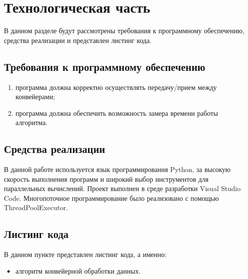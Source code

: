 \documentclass[a4paper, 12pt]{article}
\begin{document}
\section{Технологическая часть}
\begin{flushleft}
	\hspace*{5mm} В данном разделе будут рассмотрены требования к программному обеспечению, средства реализации и представлен листинг кода.
	\subsection{Требования к программному обеспечению}
		\begin{enumerate}
		\item программа должна корректно осуществлять передачу/прием между конвейерами;
		\item программа должна обеспечить возможность замера времени работы алгоритма. 
	\end{enumerate}
	\subsection{Средства реализации}
	\hspace*{5mm} В данной работе используется язык программирования Python, за высокую скорость выполнения программ и широкий выбор инструментов для параллельных вычислений. Проект выполнен в среде разработки Visual Studio Code. Многопоточное программирование было реализовано с помощью ThreadPoolExecutor. \cite{doc}
	\clearpage
	\newpage 
	\subsection{Листинг кода}
	В данном пункте представлен листинг кода, а именно:
	\begin{itemize}
		\item алгоритм конвейерной обработки данных.
	\end{itemize}



\end{flushleft}
\end{document}
